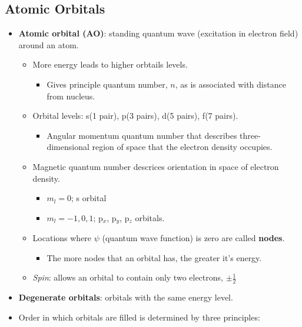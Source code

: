 \documentclass[12pt,a4paper]{article}
\begin{document}
\subsection{Atomic Orbitals}
\begin{itemize}
    \item \textbf{Atomic orbital (AO)}: standing quantum wave (excitation in electron field) around an atom.
    \begin{itemize}
            \item More energy leads to higher orbtails levels.
                \begin{itemize}
                    \item Gives principle quantum number, \(n\), as is associated with distance from nucleus.
                \end{itemize}
            \item Orbital levels: s(1 pair), p(3 pairs), d(5 pairs), f(7 pairs). 
                \begin{itemize}
                    \item Angular momentum quantum number that describes three-dimensional region of space that the electron density occupies.
                \end{itemize}
            \item Magnetic quantum number descrices orientation in space of electron density.
                \begin{itemize}
                    \item \(m_l=0\); s orbital
                    \item \(m_l=-1, 0, 1\); p\(_{x}\), p\(_{y}\), p\(_{z}\) orbitals.
                \end{itemize}
            \item Locations where $\psi$ (quantum wave function) is zero are called \textbf{nodes}.
                \begin{itemize}
                    \item The {\color{o-Sun}more nodes} that an orbital has, the {\color{o-Sun}greater} it's energy.
                \end{itemize}
            \item \textit{Spin}: allows an orbital to contain only two electrons, \(\pm \frac{1}{2}\)
        \end{itemize}
    \item \textbf{Degenerate orbitals}: orbitals with the same energy level.
    \item Order in which orbitals are filled is determined by three principles:

\end{itemize}
\end{document}

